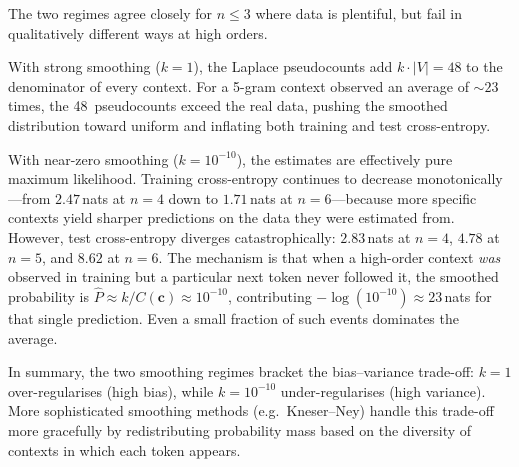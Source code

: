 \documentclass[11pt]{article}
\begin{document}
The two regimes agree closely for $n \le 3$ where data is plentiful,
but fail in qualitatively different ways at high orders.

With strong smoothing ($k = 1$), the Laplace pseudocounts add
$k \cdot |V| = 48$ to the denominator of every context.  For a 5-gram
context observed an average of ${\sim}23$ times, the 48~pseudocounts
exceed the real data, pushing the smoothed distribution toward uniform
and inflating both training and test cross-entropy.

With near-zero smoothing ($k = 10^{-10}$), the estimates are
effectively pure maximum likelihood.  Training cross-entropy continues
to decrease monotonically---from $2.47$\,nats at $n = 4$ down to
$1.71$\,nats at $n = 6$---because more specific contexts yield sharper
predictions on the data they were estimated from.
However, test cross-entropy diverges catastrophically: $2.83$\,nats at
$n = 4$, $4.78$ at $n = 5$, and $8.62$ at $n = 6$.
The mechanism is that when a high-order context \emph{was} observed in
training but a particular next token never followed it, the smoothed
probability is $\hat{P} \approx k / C(\mathbf{c}) \approx 10^{-10}$,
contributing $-\log(10^{-10}) \approx 23$\,nats for that single
prediction.  Even a small fraction of such events dominates the average.

In summary, the two smoothing regimes bracket the bias--variance
trade-off: $k = 1$ over-regularises (high bias), while $k = 10^{-10}$
under-regularises (high variance).  More sophisticated smoothing methods
(e.g.\ Kneser--Ney) handle this trade-off more gracefully by
redistributing probability mass based on the diversity of contexts in
which each token appears.
\end{document}
